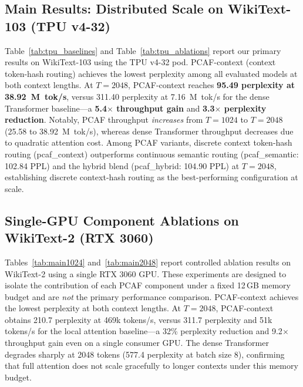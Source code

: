 \documentclass{article}
\begin{document}
\subsection{Main Results: Distributed Scale on WikiText-103 (TPU v4-32)}

Table~\ref{tab:tpu_baselines} and Table~\ref{tab:tpu_ablations} report our
primary results on WikiText-103 using the TPU v4-32 pod.
PCAF-context (context token-hash routing) achieves the lowest perplexity
among all evaluated models at both context lengths. At $T{=}2048$,
PCAF-context reaches \textbf{95.49 perplexity at 38.92~M~tok/s},
versus 311.40 perplexity at 7.16~M~tok/s for the dense Transformer
baseline---a \textbf{5.4$\times$ throughput gain} and \textbf{3.3$\times$
perplexity reduction}. Notably, PCAF throughput \emph{increases} from
$T{=}1024$ to $T{=}2048$ (25.58 to 38.92~M~tok/s), whereas dense Transformer
throughput decreases due to quadratic attention cost. Among PCAF variants,
discrete context token-hash routing (pcaf\_context) outperforms continuous
semantic routing (pcaf\_semantic: 102.84 PPL) and the hybrid blend
(pcaf\_hybrid: 104.90 PPL) at $T{=}2048$, establishing discrete context-hash
routing as the best-performing configuration at scale.

\subsection{Single-GPU Component Ablations on WikiText-2 (RTX 3060)}

Tables~\ref{tab:main1024} and~\ref{tab:main2048} report controlled ablation
results on WikiText-2 using a single RTX 3060 GPU. These experiments are
designed to isolate the contribution of each PCAF component under a fixed
12\,GB memory budget and are \emph{not} the primary performance comparison.
PCAF-context achieves the lowest perplexity at both context lengths. At
$T{=}2048$, PCAF-context obtains 210.7 perplexity at 469k tokens/s, versus
311.7 perplexity and 51k tokens/s for the local attention baseline---a 32\%
perplexity reduction and 9.2$\times$ throughput gain even on a single consumer
GPU. The dense Transformer degrades sharply at 2048 tokens (577.4 perplexity
at batch size 8), confirming that full attention does not scale gracefully to
longer contexts under this memory budget.
\end{document}

